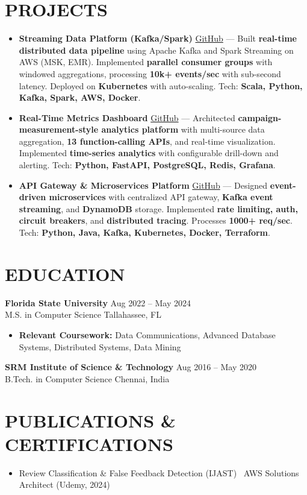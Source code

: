 \documentclass[letterpaper,10pt]{article}
\newcommand{\resumeItem}[1]{\item\small #1}
\newcommand{\resumeSubheading}[4]{
  \vspace{6pt}
  \noindent
  \textbf{#1} \hfill {\footnotesize #2} \\
  [-1pt]
  \noindent
  \small #3 \hfill {\small #4}
  \vspace{3pt}
}
\newcommand{\resumeItemsStart}{\vspace{-2pt}\begin{itemize}}
\newcommand{\resumeItemsEnd}{\end{itemize}\vspace{6pt}}
\begin{document}
\section{\textcolor{metablue}{PROJECTS}}
\vspace{-5pt}
\begin{tcolorbox}[colback=white,colframe=metablue,boxrule=0.8pt,arc=2pt,left=4pt,right=4pt,top=2pt,bottom=2pt]
\begin{itemize}
\resumeItem{\textbf{Streaming Data Platform (Kafka/Spark)} \href{https://github.com/adityasugandhi}{GitHub} --- Built \textbf{real-time distributed data pipeline} using Apache Kafka and Spark Streaming on AWS (MSK, EMR). Implemented \textbf{parallel consumer groups} with windowed aggregations, processing \textbf{10k+ events/sec} with sub-second latency. Deployed on \textbf{Kubernetes} with auto-scaling. Tech: \textbf{Scala, Python, Kafka, Spark, AWS, Docker}.}

\resumeItem{\textbf{Real-Time Metrics Dashboard} \href{https://github.com/adityasugandhi}{GitHub} --- Architected \textbf{campaign-measurement-style analytics platform} with multi-source data aggregation, \textbf{13 function-calling APIs}, and real-time visualization. Implemented \textbf{time-series analytics} with configurable drill-down and alerting. Tech: \textbf{Python, FastAPI, PostgreSQL, Redis, Grafana}.}

\resumeItem{\textbf{API Gateway \& Microservices Platform} \href{https://github.com/adityasugandhi}{GitHub} --- Designed \textbf{event-driven microservices} with centralized API gateway, \textbf{Kafka event streaming}, and \textbf{DynamoDB} storage. Implemented \textbf{rate limiting, auth, circuit breakers}, and \textbf{distributed tracing}. Processes \textbf{1000+ req/sec}. Tech: \textbf{Python, Java, Kafka, Kubernetes, Docker, Terraform}.}

\end{itemize}
\end{tcolorbox}
\vspace{-5pt}


\section{\textcolor{metablue}{EDUCATION}}
\vspace{-10pt}
\resumeSubheading
{Florida State University}{Aug 2022 -- May 2024}
{M.S. in Computer Science}{Tallahassee, FL}
\resumeItemsStart
\resumeItem{\textbf{Relevant Coursework:} Data Communications, Advanced Database Systems, Distributed Systems, Data Mining}
\resumeItemsEnd
\vspace{-5pt}
\resumeSubheading
{SRM Institute of Science \& Technology}{Aug 2016 -- May 2020}
{B.Tech. in Computer Science}{Chennai, India}
\vspace{-10pt}

\section{\textcolor{metablue}{PUBLICATIONS \& CERTIFICATIONS}}
\vspace{-5pt}
\begin{itemize}
\resumeItem{Review Classification \& False Feedback Detection (IJAST) \textbar\ AWS Solutions Architect (Udemy, 2024)}
\end{itemize}
\end{document}

